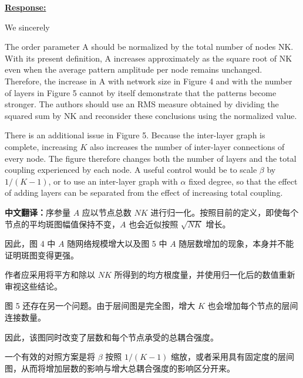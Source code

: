 \documentclass[a4paper,12pt]{article}
\newcommand{\zhtranslationfirst}[1]{%
    \par\medskip\noindent
    {\small\color{blue!60!black}\textbf{中文翻译：}#1}\par
}
\newcommand{\zhtranslation}[1]{%
    \par\smallskip\noindent
    {\small\color{blue!60!black}#1}\par
}
\begin{document}
\noindent \underline {\textbf{Response:}}
\bigskip

We sincerely


\newpage
\begin{tcolorbox}[title = {Comment 4 Normalization of the order parameter},fonttitle = \bfseries]
    The order parameter A should be normalized by the total number of nodes NK. With its present definition, A increases approximately as the square root of NK even when the average pattern amplitude per node remains unchanged. Therefore, the increase in A with network size in Figure 4 and with the number of layers in Figure 5 cannot by itself demonstrate that the patterns become stronger. The authors should use an RMS measure obtained by dividing the squared sum by NK and reconsider these conclusions using the normalized value.

    \medskip

    There is an additional issue in Figure 5. Because the inter-layer graph is complete, increasing $K$ also increases the number of inter-layer connections of every node. The figure therefore changes both the number of layers and the total coupling experienced by each node. A useful control would be to scale $\beta$ by $1/(K - 1)$, or to use an inter-layer graph with $\alpha$ fixed degree, so that the effect of adding layers can be separated from the effect of increasing total coupling.
    \zhtranslationfirst{序参量 $A$ 应以节点总数 $NK$ 进行归一化。按照目前的定义，即使每个节点的平均斑图幅值保持不变，$A$ 也会近似按照 $\sqrt{NK}$ 增长。}
    \zhtranslation{因此，图 4 中 $A$ 随网络规模增大以及图 5 中 $A$ 随层数增加的现象，本身并不能证明斑图变得更强。}
    \zhtranslation{作者应采用将平方和除以 $NK$ 所得到的均方根度量，并使用归一化后的数值重新审视这些结论。}

    \zhtranslation{图 5 还存在另一个问题。由于层间图是完全图，增大 $K$ 也会增加每个节点的层间连接数量。}
    \zhtranslation{因此，该图同时改变了层数和每个节点承受的总耦合强度。}
    \zhtranslation{一个有效的对照方案是将 $\beta$ 按照 $1/(K - 1)$ 缩放，或者采用具有固定度的层间图，从而将增加层数的影响与增大总耦合强度的影响区分开来。}
\end{tcolorbox}
\end{document}
